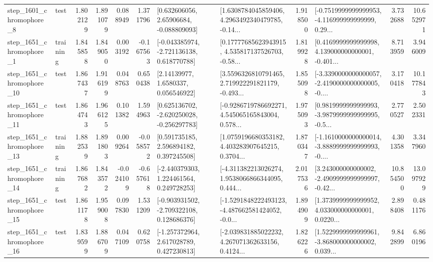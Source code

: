 \begin{tabular}{llrrrrllrlrr}
  step\_1601\_chromophore\_8 &      test &      1.802129 &    1.891079 &      0.088949 &  1.371796 &     [0.632606056, 2.65906684, -0.088809093] &  [1.6308784045859406, 4.2963492340479785, -0.14... &       1.918500 &  [-0.7519999999999953, -4.116999999999999, 0.29... &            3.732688 &         10.652971 \\
  step\_1651\_chromophore\_1 &  training &      1.845858 &    1.849050 &      0.003192 & -0.167563 &   [-0.043385974, -2.721136138, 0.618770788] &  [0.17777685623943915, 4.535817137526703, -0.58... &       1.819928 &  [0.4169999999999998, 4.139000000000001, -0.401... &            8.713959 &          3.946009 \\
 step\_1651\_chromophore\_10 &      test &      1.867437 &    1.916199 &      0.048763 &  0.650438 &        [2.14139977, 1.6580337, 0.056546922] &  [3.5596326810791465, 2.719922291821179, -0.493... &       1.855098 &  [-3.3390000000000057, -2.4190000000000005, -0.... &            3.170418 &         10.177843 \\
 step\_1651\_chromophore\_11 &      test &      1.864743 &    1.966125 &      0.101382 &  1.594963 &   [0.625136702, -2.620250028, -0.256297783] &  [-0.9286719786692271, 4.545065165843004, 0.578... &       1.975093 &  [0.9819999999999993, -3.9879999999999995, -0.5... &            2.770527 &          2.502331 \\
 step\_1651\_chromophore\_13 &  training &      1.882539 &    1.891803 &      0.009264 & -0.058572 &     [0.591735185, 2.596894182, 0.397245508] &  [1.0759196680353182, 4.403283907645215, 0.3704... &       1.870347 &  [-1.1610000000000014, -3.8889999999999993, -0.... &            4.301358 &          3.347960 \\
 step\_1651\_chromophore\_14 &  training &      1.867682 &    1.843572 &     -0.024109 & -0.657618 &    [-2.440379303, 1.224461564, 0.249728253] &  [-4.311382213026274, 1.9538066866344095, 0.444... &       2.017536 &  [3.243000000000002, -2.4909999999999997, -0.42... &           10.854500 &         13.097929 \\
 step\_1651\_chromophore\_15 &      test &      1.861178 &    1.959008 &      0.097830 &  1.531209 &   [-0.903931502, -2.709322108, 0.128686376] &  [-1.5291848222493123, -4.487662581424052, -0.0... &       1.894909 &  [1.3739999999999952, 4.033000000000001, 0.0220... &            2.898408 &          0.481176 \\
 step\_1651\_chromophore\_16 &      test &      1.839599 &    1.886709 &      0.047109 &  0.620758 &    [-1.257372964, 2.617028789, 0.427230813] &  [-2.039831885022232, 4.267071362633156, 0.4124... &       1.826226 &  [1.5229999999999961, -3.868000000000002, 0.039... &            9.842899 &          6.860196 \\

\end{tabular}
